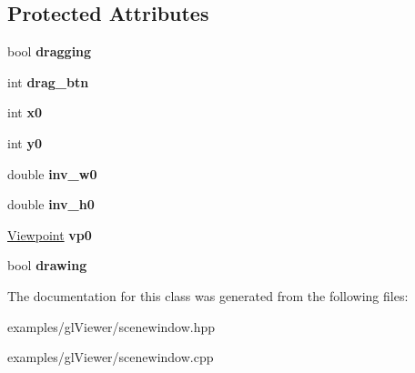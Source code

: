 \subsection*{Protected Attributes}
\begin{DoxyCompactItemize}
\item 
\mbox{\label{classglwindow_1_1_scene_window_a7d77c829486011d04815eeb114919d71}} 
bool {\bfseries dragging}
\item 
\mbox{\label{classglwindow_1_1_scene_window_aeb7b1933324b7e32ef1c27496e398843}} 
int {\bfseries drag\+\_\+btn}
\item 
\mbox{\label{classglwindow_1_1_scene_window_a92ed7e285bc0c1f72bbe34830c2fa839}} 
int {\bfseries x0}
\item 
\mbox{\label{classglwindow_1_1_scene_window_a5a7ef8f289c9ef5d4546099724bfff77}} 
int {\bfseries y0}
\item 
\mbox{\label{classglwindow_1_1_scene_window_a261ceaff788f0d6c2d01ca71d2b268c7}} 
double {\bfseries inv\+\_\+w0}
\item 
\mbox{\label{classglwindow_1_1_scene_window_acb85c5bbf1a1e7152b5518c298e9e6cb}} 
double {\bfseries inv\+\_\+h0}
\item 
\mbox{\label{classglwindow_1_1_scene_window_a331e548ff2c83c970ca9ebddcd04581c}} 
\hyperlink{structglwindow_1_1_scene_window_1_1_viewpoint}{Viewpoint} {\bfseries vp0}
\item 
\mbox{\label{classglwindow_1_1_scene_window_a93a5025d20cd92db7bf541764fe32b93}} 
bool {\bfseries drawing}
\end{DoxyCompactItemize}


The documentation for this class was generated from the following files\+:\begin{DoxyCompactItemize}
\item 
examples/gl\+Viewer/scenewindow.\+hpp\item 
examples/gl\+Viewer/scenewindow.\+cpp\end{DoxyCompactItemize}
